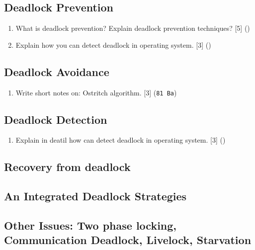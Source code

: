 \documentclass[12pt]{article}
\begin{document}
	\subsection{Deadlock Prevention}
		\begin{enumerate}
			\item What is deadlock prevention? Explain deadlock prevention techniques? \hfill [5] ()

			\item Explain how you can detect deadlock in operating system. \hfill [3] ()
		\end{enumerate}
	\subsection{Deadlock Avoidance}
		\begin{enumerate}
			\item Write short notes on: Ostritch algorithm. \hfill [3] (\texttt{81 Ba})
		\end{enumerate}
	\subsection{Deadlock Detection}
		\begin{enumerate}
			\item Explain in deatil how can detect deadlock in operating system. \hfill [3] ()
		\end{enumerate}
	\subsection{Recovery from deadlock}
	\subsection{An Integrated Deadlock Strategies}
	\subsection{Other Issues: Two phase locking, Communication Deadlock, Livelock, Starvation}
\end{document}
